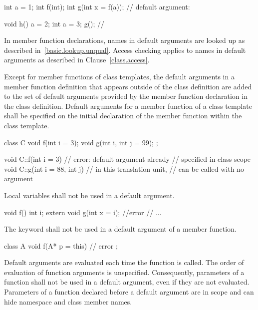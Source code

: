 \begin{codeblock}
int a = 1;
int f(int);
int g(int x = f(a));            // default argument: 

void h() {
  a = 2;
  {
  int a = 3;
  g();                          // 
  }
}
\end{codeblock}
\exitexample
\enternote
In member function declarations,
names in default arguments are looked up
as described in~\ref{basic.lookup.unqual}.
Access checking applies to names in default arguments as
described in Clause~\ref{class.access}.
\exitnote

\pnum
Except for member functions of class templates, the
default arguments in a member function definition that appears
outside of the class definition
are added to the set of default arguments provided by the
member function declaration in the class definition.
Default arguments for a member function of a class template
shall be specified on the initial declaration of the member
function within the class template.
\enterexample

\begin{codeblock}
class C {
  void f(int i = 3);
  void g(int i, int j = 99);
};

void C::f(int i = 3) {          // error: default argument already
}                               // specified in class scope
void C::g(int i = 88, int j) {  // in this translation unit,
}                               //  can be called with no argument
\end{codeblock}
\exitexample

\pnum
Local variables shall not be used in a default argument.
\enterexample

\begin{codeblock}
void f() {
  int i;
  extern void g(int x = i);     //error
  // ...
}
\end{codeblock}
\exitexample

\pnum
The keyword
shall not be used in a default argument of a member function.
\enterexample

\begin{codeblock}
class A {
  void f(A* p = this) { }       // error
};
\end{codeblock}
\exitexample

\pnum
{}%
Default arguments are evaluated each time the function is called.
The order of evaluation of function arguments is
unspecified.
%
%
Consequently,
parameters of a function shall not be used in a default argument,
even if they are not evaluated.
%
Parameters of a function declared before a default argument
are in scope and can hide namespace and class member names.
\enterexample

